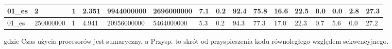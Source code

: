 \documentclass[12pt]{article}
\begin{document}
\begin{flushleft}
\begin{landscape}
\begin{tabular}{| l | l | l | l | l | l | l | l | l | l | l | l | l | l | l | l |}
		01\_es & 2 & 1 & 2.351 & 9944000000 & 2696000000 & 7.1 & 0.2 & 92.4 & 75.8 & 16.6 & 22.5 & 0.0 & 0.0 & 2.8 & 27.3 \\ \hline
		01\_es & 250000000 & 1 & 4.941 & 20956000000 & 5464000000 & 5.3 & 0.2 & 94.3 & 77.3 & 17.0 & 22.3 & 0.7 & 5.6 & 0.0 & 27.2 \\ \hline
	\end{tabular}
\end{landscape}
gdzie Czas użycia procesorów jest sumaryczny, a Przysp. to skrót od przyspieszenia kodu równoległego względem sekwencyjnego.
	
\end{flushleft}
\end{document}
